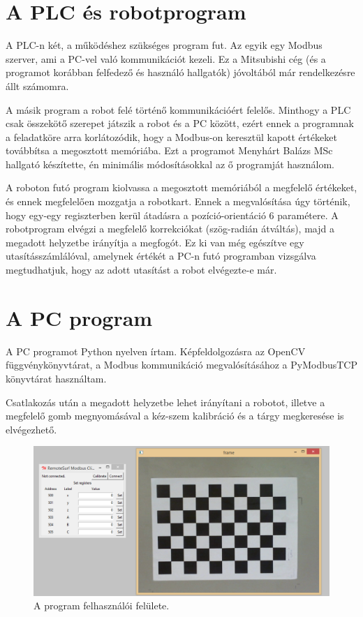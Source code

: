 	\section{A PLC és robotprogram}
	
	A PLC-n két, a működéshez szükséges program fut. Az egyik egy Modbus szerver, ami a PC-vel való kommunikációt kezeli. Ez a Mitsubishi cég (és a programot korábban felfedező és használó hallgatók) jóvoltából már rendelkezésre állt számomra. 
	
	A másik program a robot felé történő kommunikációért felelős. Minthogy a PLC csak összekötő szerepet játszik a robot és a PC között, ezért ennek a programnak a feladatköre arra korlátozódik, hogy a Modbus-on keresztül kapott értékeket továbbítsa a megosztott memóriába. Ezt a programot Menyhárt Balázs MSc hallgató készítette, én minimális módosításokkal az ő programját használom.
	
	A roboton futó program kiolvassa a megosztott memóriából a megfelelő értékeket, és ennek megfelelően mozgatja a robotkart. Ennek a megvalósítása úgy történik, hogy egy-egy regiszterben kerül átadásra a pozíció-orientáció 6 paramétere. A robotprogram elvégzi a megfelelő korrekciókat (szög-radián átváltás), majd a megadott helyzetbe irányítja a megfogót. Ez ki van még egészítve egy utasításszámlálóval, amelynek értékét a PC-n futó programban vizsgálva megtudhatjuk, hogy az adott utasítást a robot elvégezte-e már.

	\section{A PC program}
	
	A PC programot Python nyelven írtam. Képfeldolgozásra az OpenCV függvénykönyvtárat, a Modbus kommunikáció megvalósításához a PyModbusTCP könyvtárat használtam.

	Csatlakozás után a megadott helyzetbe lehet irányítani a robotot, illetve a megfelelő gomb megnyomásával a kéz-szem kalibráció és a tárgy megkeresése is elvégezhető.
	
\begin{figure}[H]
\centering
\includegraphics[width=\linewidth]{chapters/implementation/gui.png}
\caption{A program felhasználói felülete.}
\label{img-gui}
\end{figure}

